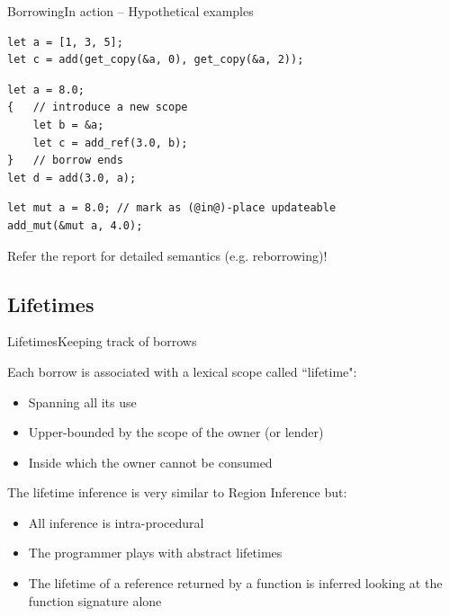 \documentclass[xcolor=x11names,compress]{beamer}
\renewcommand{\(}{\begin{columns}}
\renewcommand{\)}{\end{columns}}
\newcommand{\<}[1]{\begin{column}{#1}}
\renewcommand{\>}{\end{column}}
\begin{document}
\begin{frame}[fragile]{Borrowing}{In action -- Hypothetical examples}
\begin{lstlisting}
let a = [1, 3, 5];
let c = add(get_copy(&a, 0), get_copy(&a, 2));
\end{lstlisting}
\pause

\begin{lstlisting}
let a = 8.0;
{   // introduce a new scope
    let b = &a;
    let c = add_ref(3.0, b);
}   // borrow ends
let d = add(3.0, a);
\end{lstlisting}
\pause

\begin{lstlisting}
let mut a = 8.0; // mark as (@in@)-place updateable
add_mut(&mut a, 4.0);
\end{lstlisting}
\pause
Refer the report for detailed semantics (e.g. reborrowing)!
\end{frame}

\subsection{Lifetimes}
\begin{frame}{Lifetimes}{Keeping track of borrows}

Each borrow is associated with a lexical scope called ``lifetime":

\begin{itemize}
\item Spanning all its use
\pause
\item Upper-bounded by the scope of the owner (or lender)
\pause
\item Inside which the owner cannot be consumed
\end{itemize}

\pause
The lifetime inference is very similar to Region Inference but:

\begin{itemize}
\item All inference is intra-procedural
\pause
\item The programmer plays with abstract lifetimes
\pause
\item The lifetime of a reference returned by a function is inferred looking at the function signature alone
\end{itemize}

\end{frame}
\end{document}
